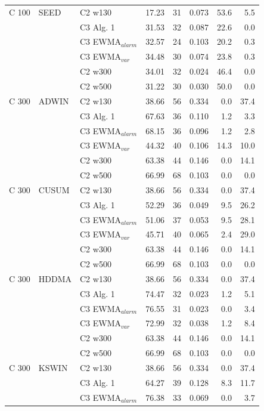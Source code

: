 \begin{longtable}{lllrrrrr}
\hline
C  100 & SEED & C2 w130 & 17.23 & 31 & 0.073 & 53.6 & 5.5 \\
 &  & C3 Alg. 1 & 31.53 & 32 & 0.087 & 22.6 & 0.0 \\
 &  & C3 EWMA$_{alarm}$ & 32.57 & 24 & 0.103 & 20.2 & 0.3 \\
 &  & C3 EWMA$_{var}$ & 34.48 & 30 & 0.074 & 23.8 & 0.3 \\
 &  & C2 w300 & 34.01 & 32 & 0.024 & 46.4 & 0.0 \\
 &  & C2 w500 & 31.22 & 30 & 0.030 & 50.0 & 0.0 \\
\hline
C  300 & ADWIN & C2 w130 & 38.66 & 56 & 0.334 & 0.0 & 37.4 \\
 &  & C3 Alg. 1 & 67.63 & 36 & 0.110 & 1.2 & 3.3 \\
 &  & C3 EWMA$_{alarm}$ & 68.15 & 36 & 0.096 & 1.2 & 2.8 \\
 &  & C3 EWMA$_{var}$ & 44.32 & 40 & 0.106 & 14.3 & 10.0 \\
 &  & C2 w300 & 63.38 & 44 & 0.146 & 0.0 & 14.1 \\
 &  & C2 w500 & 66.99 & 68 & 0.103 & 0.0 & 0.0 \\
\hline
C  300 & CUSUM & C2 w130 & 38.66 & 56 & 0.334 & 0.0 & 37.4 \\
 &  & C3 Alg. 1 & 52.29 & 36 & 0.049 & 9.5 & 26.2 \\
 &  & C3 EWMA$_{alarm}$ & 51.06 & 37 & 0.053 & 9.5 & 28.1 \\
 &  & C3 EWMA$_{var}$ & 45.71 & 40 & 0.065 & 2.4 & 29.0 \\
 &  & C2 w300 & 63.38 & 44 & 0.146 & 0.0 & 14.1 \\
 &  & C2 w500 & 66.99 & 68 & 0.103 & 0.0 & 0.0 \\
\hline
C  300 & HDDMA & C2 w130 & 38.66 & 56 & 0.334 & 0.0 & 37.4 \\
 &  & C3 Alg. 1 & 74.47 & 32 & 0.023 & 1.2 & 5.1 \\
 &  & C3 EWMA$_{alarm}$ & 76.55 & 31 & 0.023 & 0.0 & 3.4 \\
 &  & C3 EWMA$_{var}$ & 72.99 & 32 & 0.038 & 1.2 & 8.4 \\
 &  & C2 w300 & 63.38 & 44 & 0.146 & 0.0 & 14.1 \\
 &  & C2 w500 & 66.99 & 68 & 0.103 & 0.0 & 0.0 \\
\hline
C  300 & KSWIN & C2 w130 & 38.66 & 56 & 0.334 & 0.0 & 37.4 \\
 &  & C3 Alg. 1 & 64.27 & 39 & 0.128 & 8.3 & 11.7 \\
 &  & C3 EWMA$_{alarm}$ & 76.38 & 33 & 0.069 & 0.0 & 3.7 \\

\end{longtable}
